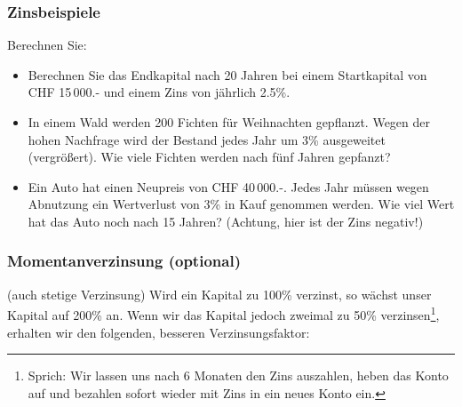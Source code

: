 \newpage

\subsubsection{Zinsbeispiele}

Berechnen Sie:

\begin{itemize}
  \item Berechnen Sie das Endkapital nach 20 Jahren bei einem
  Startkapital von CHF 15\,000.- und einem Zins von jährlich
  2.5\%.\\%

\item In einem Wald werden 200 Fichten für Weihnachten
  gepflanzt. Wegen der hohen Nachfrage wird der Bestand jedes Jahr um
  3\% ausgeweitet (vergrößert).
  Wie viele Fichten werden nach fünf Jahren gepfanzt?


\item Ein Auto hat einen Neupreis von CHF 40\,000.-. Jedes Jahr müssen wegen Abnutzung ein Wertverlust von 3\% in Kauf
  genommen werden. Wie viel Wert hat das Auto noch nach 15 Jahren? (Achtung, hier ist der Zins negativ!)

\end{itemize}
\newpage



\newpage

\subsubsection{Momentanverzinsung (optional)}
(auch stetige Verzinsung)
Wird ein Kapital zu 100\% verzinst, so wächst unser Kapital auf 200\%
an. Wenn wir das Kapital jedoch zweimal zu 50\%
verzinsen\footnote{Sprich: Wir lassen uns nach 6 Monaten den Zins
auszahlen, heben das Konto auf und bezahlen sofort wieder mit Zins in
ein neues Konto ein.}, erhalten wir den folgenden, besseren Verzinsungsfaktor:

